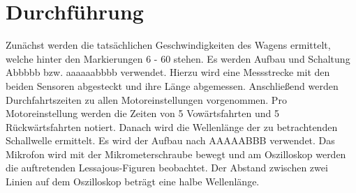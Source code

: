 
\section{Durchführung}
\label{sec:Durchführung}

\renewcommand{\labelenumi}{\alph{enumi})}
Zunächst werden die tatsächlichen Geschwindigkeiten des Wagens ermittelt, welche
 hinter den Markierungen 6 - 60 stehen. Es werden Aufbau und Schaltung Abbbbb bzw. aaaaaabbbb verwendet. Hierzu wird eine Messstrecke mit den
  beiden Sensoren abgesteckt und ihre Länge abgemessen. Anschließend werden
   Durchfahrtszeiten zu allen Motoreinstellungen vorgenommen. Pro Motoreinstellung
    werden die Zeiten von 5 Vowärtsfahrten und 5 Rückwärtsfahrten notiert. Danach
     wird die Wellenlänge der zu betrachtenden Schallwelle ermittelt. Es wird der Aufbau nach AAAAABBB verwendet.
      Das Mikrofon wird mit der Mikrometerschraube bewegt und am Oszilloskop werden
       die auftretenden Lessajous-Figuren beobachtet. Der Abstand zwischen zwei
        Linien auf dem Oszilloskop beträgt eine halbe Wellenlänge.
